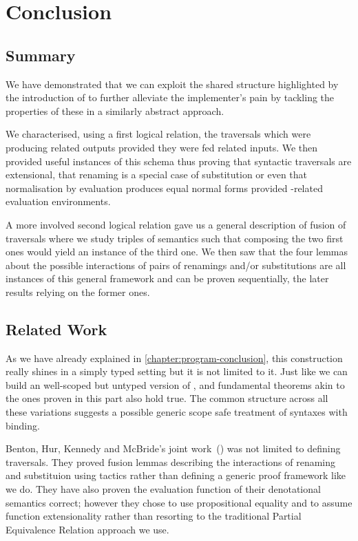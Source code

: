 \chapter{Conclusion}

\section{Summary}

We have demonstrated that we can exploit the shared structure highlighted by the introduction
of  to further alleviate the implementer's pain by tackling the properties of
these  in a similarly abstract approach.

We characterised, using a first logical relation, the traversals which were producing related
outputs provided they were fed related inputs. We then provided useful instances of this schema
thus proving that syntactic traversals are extensional, that renaming is a special case of
substitution or even that normalisation by evaluation produces equal normal forms provided
-related evaluation environments.

A more involved second logical relation gave us a general description of fusion of traversals
where we study triples of semantics such that composing the two first ones would yield an
instance of the third one. We then saw that the four lemmas about the possible interactions
of pairs of renamings and/or substitutions are all instances of this general framework and
can be proven sequentially, the later results relying on the former ones.

\section{Related Work}

As we have already explained in \cref{chapter:program-conclusion}, this construction
really shines in a simply typed setting but it is not limited to it. Just like we can
build an well-scoped but untyped version of ,  and 
fundamental theorems akin to the ones proven in this part also hold true. The common
structure across all these variations suggests a possible generic scope safe treatment
of syntaxes with binding.

Benton, Hur, Kennedy and McBride's joint work~(\citeyear{benton2012strongly}) was not
limited to defining traversals. They proved fusion lemmas describing the interactions
of renaming and substituion using tactics rather than defining a generic proof framework
like we do. They have also proven the evaluation function of their denotational semantics
correct; however they chose to use propositional equality and to assume function extensionality
rather than resorting to the traditional Partial Equivalence Relation approach we use.

